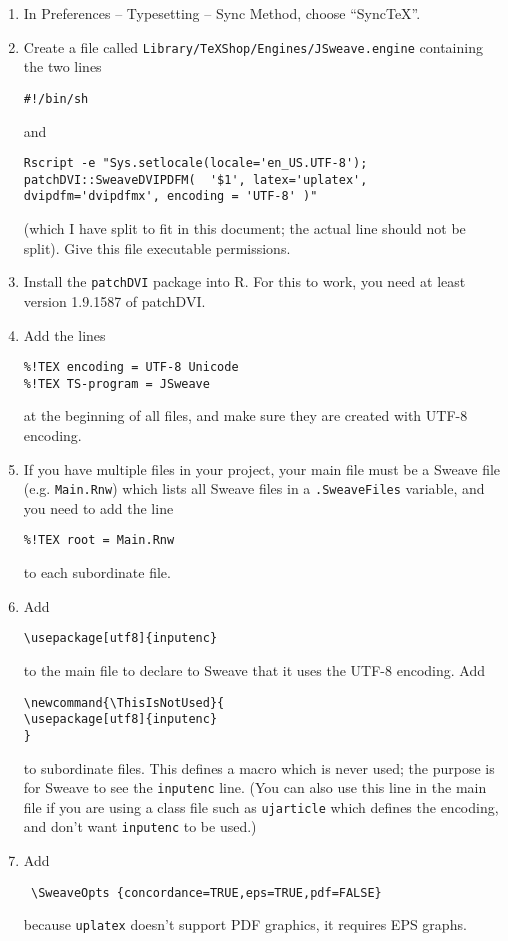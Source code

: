 \documentclass[12pt]{ujarticle}
\newcommand{\ThisIsNotUsed}{
\usepackage[utf8]{inputenc}
}
\begin{document}
\begin{enumerate}
\item In Preferences -- Typesetting -- Sync Method, choose ``SyncTeX''.
\item Create a file called \verb!Library/TeXShop/Engines/JSweave.engine! 
containing the two lines
\begin{verbatim}
#!/bin/sh
\end{verbatim}
and
\begin{verbatim}
Rscript -e "Sys.setlocale(locale='en_US.UTF-8');
patchDVI::SweaveDVIPDFM(  '$1', latex='uplatex', 
dvipdfm='dvipdfmx', encoding = 'UTF-8' )"
\end{verbatim}
(which I have split to fit in this document; the actual line should not be split).
Give this file executable permissions.  
\item Install the \texttt{patchDVI} package into R.  For this to work,  you need
at least version 1.9.1587 of patchDVI.
\item Add the lines 
\begin{verbatim}
%!TEX encoding = UTF-8 Unicode
%!TEX TS-program = JSweave
\end{verbatim}
at the beginning of all files, and make sure they are created with UTF-8 encoding.
\item If you have multiple files in your project, your main file must be a Sweave file
(e.g. \texttt{Main.Rnw}) which lists all Sweave files in a \texttt{.SweaveFiles} variable, 
and you need to add the line
\begin{verbatim}
%!TEX root = Main.Rnw
\end{verbatim}
to each subordinate file.
\item Add
\begin{verbatim}
\usepackage[utf8]{inputenc}
\end{verbatim}
to the main file to declare to Sweave that it uses the UTF-8 encoding.  Add
\begin{verbatim}
\newcommand{\ThisIsNotUsed}{
\usepackage[utf8]{inputenc}
}
\end{verbatim}
to subordinate files.  This defines a macro which is never used; the purpose is
for Sweave to see the \texttt{inputenc} line.  (You can also use this line in the main file
if you are using a class file such as \texttt{ujarticle} which defines the encoding, 
and don't want \texttt{inputenc} to be used.)
\item Add 
\begin{verbatim}
 \SweaveOpts {concordance=TRUE,eps=TRUE,pdf=FALSE}
\end{verbatim}
because \verb!uplatex! doesn't support PDF graphics, it requires EPS graphs.

\end{enumerate}
\end{document}
